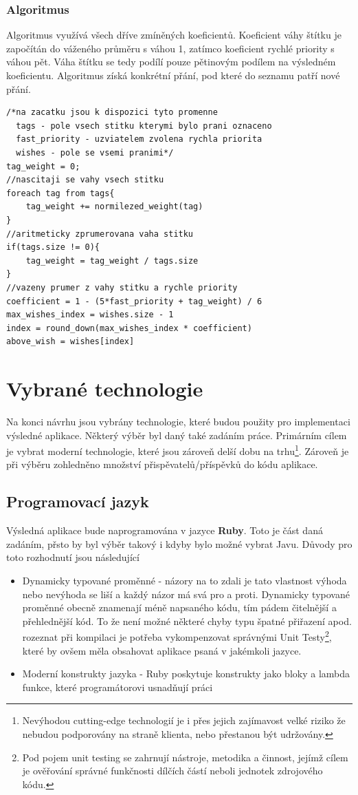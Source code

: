 \subsubsection{Algoritmus}
Algoritmus využívá všech dříve zmíněných koeficientů. Koeficient váhy štítku je započítán do váženého průměru s váhou 1, zatímco koeficient rychlé priority s váhou pět. Váha štítku se tedy podílí pouze pětinovým podílem na výsledném koeficientu. Algoritmus získá konkrétní přání, pod které do seznamu patří nové přání.
\lstset{language = c, style=custom}
\begin{lstlisting}
/*na zacatku jsou k dispozici tyto promenne
  tags - pole vsech stitku kterymi bylo prani oznaceno
  fast_priority - uzviatelem zvolena rychla priorita
  wishes - pole se vsemi pranimi*/
tag_weight = 0;
//nascitaji se vahy vsech stitku
foreach tag from tags{
	tag_weight += normilezed_weight(tag)
}
//aritmeticky zprumerovana vaha stitku
if(tags.size != 0){
	tag_weight = tag_weight / tags.size
}
//vazeny prumer z vahy stitku a rychle priority
coefficient = 1 - (5*fast_priority + tag_weight) / 6
max_wishes_index = wishes.size - 1
index = round_down(max_wishes_index * coefficient)
above_wish = wishes[index]
\end{lstlisting}

\section{Vybrané technologie}
Na konci návrhu jsou vybrány technologie, které budou použity pro implementaci výsledné aplikace. Některý výběr byl daný také zadáním práce. Primárním cílem je vybrat moderní technologie, které jsou zároveň delší dobu na trhu\footnote{Nevýhodou cutting-edge technologií je i přes jejich zajímavost velké riziko že nebudou podporovány na straně klienta, nebo přestanou být udržovány.}. Zároveň je při výběru zohledněno množství přispěvatelů/příspěvků do kódu aplikace.
\subsection{Programovací jazyk}
Výsledná aplikace bude naprogramována v jazyce \textbf{Ruby}. Toto je část daná zadáním, přsto by byl výběr takový i kdyby bylo možné vybrat Javu. Důvody pro toto rozhodnutí jsou následující
\begin{itemize}
\item Dynamicky typované proměnné - názory na to zdali je tato vlastnost výhoda nebo nevýhoda se liší a každý názor má svá pro a proti. Dynamicky typované proměnné obecně znamenají méně napsaného kódu, tím pádem čitelnější a přehlednější kód. To že není možné některé chyby typu špatné přiřazení apod. rozeznat při kompilaci je potřeba vykompenzovat správnými Unit Testy\footnote{Pod pojem unit testing se zahrnují nástroje, metodika a činnost, jejímž cílem je ověřování správné funkčnosti dílčích částí neboli jednotek zdrojového kódu.}, které by ovšem měla obsahovat aplikace psaná v jakémkoli jazyce\cite{website:oreilly:unit-testing}.
\item Moderní konstrukty jazyka - Ruby poskytuje konstrukty jako bloky a lambda funkce, které programátorovi usnadňují práci

\end{itemize}

